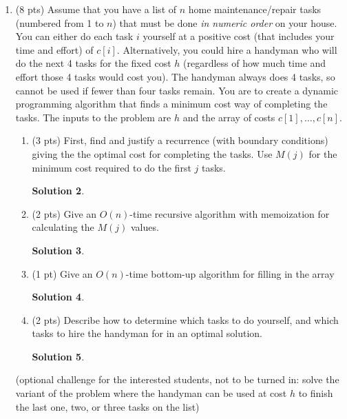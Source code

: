 \documentclass[11pt]{article}
\newtheorem*{solution}{Solution}
\begin{document}
\begin{enumerate}
\begin{solution}

\end{solution}
\newpage
\item (8  pts) Assume that you have a list of $n$ home maintenance/repair tasks (numbered from 1 to $n$) that must be done \emph{in numeric order} on your house.  
 You can either do each task $i$ yourself at a positive cost (that includes your time and effort) of $c[i]$.  
 Alternatively, you could hire a handyman who will do the next 4 tasks for the fixed cost $h$ (regardless of how much time and effort those 4 tasks would  cost you).  
 The handyman always does 4 tasks, so cannot be used if fewer than four tasks remain.
You are to create a dynamic programming algorithm that finds a minimum cost way of completing the tasks.
The inputs to the problem are $h$ and the array of costs $c[1], \ldots, c[n]$.

\begin{enumerate}
\item (3 pts) First, find and justify a recurrence (with boundary conditions) giving the the optimal cost for completing the tasks.  Use $M(j)$ for the minimum cost required to do the first $j$ tasks.
\begin{solution}

\end{solution}
\newpage
\item (2 pts) Give an $O(n)$-time recursive algorithm with memoization for calculating the $M(j)$ values.

\begin{solution}

\end{solution}
\newpage

\item (1 pt) Give an $O(n)$-time bottom-up algorithm for filling in the array
\begin{solution}

\end{solution}
\newpage

\item (2 pts) Describe how to determine which tasks to do yourself, and which tasks to hire the handyman for in an optimal solution.
\begin{solution}

\end{solution}
\end{enumerate}

(optional challenge for the interested students, not to be turned in: solve the variant of the problem 
where the handyman can be used at cost $h$ to finish the last one, two, or three tasks on the list) 
\newpage


\end{enumerate}
\end{document}

